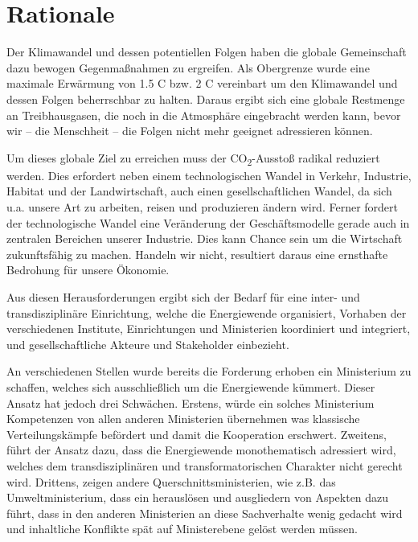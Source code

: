 \section{Rationale}

Der Klimawandel und dessen potentiellen Folgen haben die globale Gemeinschaft dazu bewogen Gegenmaßnahmen zu ergreifen. Als Obergrenze wurde eine maximale Erwärmung von 1.5 \degree{}C bzw. 2 \degree{}C vereinbart um den Klimawandel und dessen Folgen beherrschbar zu halten.
Daraus ergibt sich eine globale Restmenge an Treibhausgasen, die noch in die Atmosphäre eingebracht werden kann, bevor wir -- die Menschheit -- die Folgen nicht mehr geeignet adressieren können.

Um dieses globale Ziel zu erreichen muss der CO\textsubscript{2}-Ausstoß radikal reduziert werden.
Dies erfordert neben einem technologischen Wandel in Verkehr, Industrie, Habitat und der Landwirtschaft, auch einen gesellschaftlichen Wandel, da sich u.a. unsere Art zu arbeiten, reisen und produzieren ändern wird.
Ferner fordert der technologische Wandel eine Veränderung der Geschäfts\-modelle gerade auch in zentralen Bereichen unserer Industrie.
Dies kann Chance sein um die Wirtschaft zukunftsfähig zu machen.
Handeln wir nicht, resultiert daraus eine ernsthafte Bedrohung für unsere Ökonomie.

Aus diesen Herausforderungen ergibt sich der Bedarf für eine inter- und transdisziplinäre Einrichtung, welche die Energiewende organisiert, Vorhaben der verschiedenen Institute, Einrichtungen und Ministerien koordiniert und integriert, und gesellschaftliche Akteure und Stakeholder einbezieht.

An verschiedenen Stellen wurde bereits die Forderung erhoben ein Ministerium zu schaffen, welches sich ausschließlich um die Energiewende kümmert.
Dieser Ansatz hat jedoch drei Schwächen.
Erstens, würde ein solches Ministerium Kompetenzen von allen anderen Ministerien übernehmen was klassische Verteilungskämpfe befördert und damit die Kooperation erschwert.
Zweitens, führt der Ansatz dazu, dass die Energiewende monothematisch adressiert wird, welches dem transdisziplinären und transformatorischen Charakter nicht gerecht wird.
Drittens, zeigen andere Querschnittsministerien, wie z.B. das Umweltministerium, dass ein herauslösen und ausgliedern von Aspekten dazu führt, dass in den anderen Ministerien an diese Sachverhalte wenig gedacht wird und inhaltliche Konflikte spät auf Ministerebene gelöst werden müssen.

